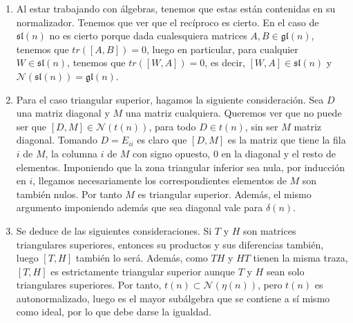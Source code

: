 \documentclass[twoside]{article}
\begin{document}
\begin{solucion}
\begin{enumerate}
\item Al estar trabajando con álgebras, tenemos que estas están contenidas en su normalizador. Tenemos que ver que el recíproco es cierto. En el caso de $\mathfrak{sl}(n)$ no es cierto porque dada cualesquiera matrices $A,B\in\mathfrak{gl}(n)$, tenemos que $tr([A,B])=0$, luego en particular, para cualquier $W\in \mathfrak{sl}(n)$, tenemos que $tr([W,A])=0$, es decir, $[W,A]\in\mathfrak{sl}(n)$ y $\mathcal{N}(\mathfrak{sl}(n))=\mathfrak{gl}(n)$. %



\item 
Para el caso triangular superior, hagamos la siguiente consideración. Sea $D$ una matriz diagonal y $M$ una matriz cualquiera. Queremos ver que no puede ser que $[D,M] \in \mathcal{N}(t(n))$, para todo $D\in t(n)$, sin ser $M$ matriz diagonal. Tomando $D=E_{ii}$ es claro que $[D,M]$ es la matriz que tiene la fila $i$ de $M$, la columna $i$ de $M$ con signo opuesto, $0$ en la diagonal y el resto de elementos. Imponiendo que la zona triangular inferior sea nula, por inducción en $i$, llegamos  necesariamente los correspondientes elementos de $M$ son también nulos. Por tanto $M$ es triangular superior. Además, el mismo argumento imponiendo además que sea diagonal vale para $\delta(n)$.

\item Se deduce de las siguientes consideraciones. Si $T$ y $H$ son matrices triangulares superiores, entonces su productos y sus diferencias también, luego $[T,H]$ también lo será. Además, como $TH$ y $HT$ tienen la misma traza, $[T,H]$ es estrictamente triangular superior aunque $T$ y $H$ sean solo triangulares superiores. Por tanto, $t(n) \subset \mathcal{N}(\eta(n))$, pero $t(n)$ es autonormalizado, luego es el mayor subálgebra que se contiene a sí mismo como ideal, por lo que debe darse la igualdad. 
\end{enumerate}
\end{solucion}
\end{document}
